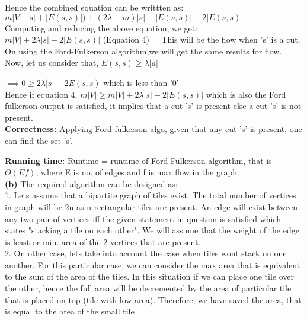 \documentclass[11pt]{article}
\renewcommand\part[1]{\vspace{.10in}\textbf{(#1)}}
\newcommand\correctness{\vspace{.10in}\textbf{Correctness: }}
\newcommand\runtime{\vspace{.10in}\textbf{Running time: }}
\begin{document}
Hence the combined equation can be writtten as:\\
$m|V-s|+|E(s,\overline{s})|)+(2\lambda +m)|s|-|E(s,\overline{s})|-2|E(s,s)|$\\[10pt]

Computing and reducing the above equation, we get:\\
$m|V|+2\lambda|s|-2|E(s,s)|$ (Equation 4) = This will be the flow when 's' is a cut.\\[10pt]

On using the Ford-Fulkerson algorithm,we will get the same results for flow.\\[10pt]

Now, let us consider that, $E(s,s) \geq \lambda|a|$

$\implies$$0\geq 2\lambda|s|- 2E(s,s)$
which is less than '0'\\[10pt]

Hence if equation 4, $m|V|\geq m|V|+2\lambda|s|-2|E(s,s)|$ which is also the Ford fulkerson output is satisfied, it implies that a cut 's' is present else a cut 's' is not present.\\[10pt] 

\correctness Applying Ford fulkerson algo, given that any cut 's' is present, one can find the set 's'.

\runtime Runtime = runtime of Ford Fulkerson algorithm, that is $O(Ef)$, where E is no. of edges and f is max flow in the graph.\\

\part{b} 
The required algorithm can be designed as:\\
1. Lets assume that a bipartite graph of tiles exist. The total number of vertices in graph will be 2n as n rectangular tiles are present. An edge will exist between any two pair of vertices iff the given statement in question is satisfied which states "stacking a tile on each other". We will assume that the weight of the edge is least or min. area of the 2 vertices that are present.\\

2. On other case, lets take into account the case when tiles wont stack on one another. For this particular case, we can consider the max area that is equivalent to the sum of the area of the tiles. In this situation if we can place one tile over the other, hence the full area will be decremented by the area of particular tile that is placed on top (tile with low area). Therefore, we have saved the area, that is equal to the area of the small tile\\ 
\end{document}
